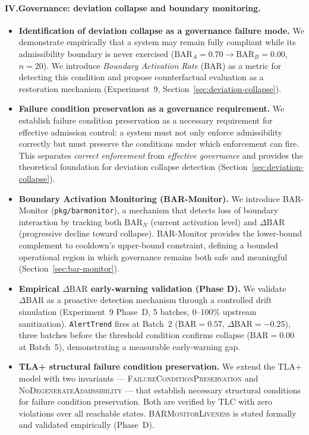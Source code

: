 \documentclass[11pt]{article}
\theoremstyle{definition}
\begin{document}
\paragraph{IV.\enspace Governance: deviation collapse and boundary monitoring.}
\begin{itemize}[noitemsep]
  \item \textbf{Identification of deviation collapse as a governance failure mode.}
    We demonstrate empirically that a system may remain fully compliant while its
    admissibility boundary is never exercised
    ($\mathrm{BAR}_A = 0.70 \to \mathrm{BAR}_B = 0.00$, $n=20$).
    We introduce \emph{Boundary Activation Rate} (BAR) as a metric for detecting this
    condition and propose counterfactual evaluation as a restoration mechanism
    (Experiment~9, Section~\ref{sec:deviation-collapse}).
  \item \textbf{Failure condition preservation as a governance requirement.}
    We establish failure condition preservation as a necessary requirement for
    effective admission control: a system must not only enforce admissibility
    correctly but must preserve the conditions under which enforcement can fire.
    This separates \emph{correct enforcement} from \emph{effective governance}
    and provides the theoretical foundation for deviation collapse detection
    (Section~\ref{sec:deviation-collapse}).
  \item \textbf{Boundary Activation Monitoring (BAR-Monitor).}
    We introduce BAR-Monitor (\texttt{pkg/barmonitor}), a mechanism that detects
    loss of boundary interaction by tracking both $\mathrm{BAR}_N$ (current
    activation level) and $\Delta\mathrm{BAR}$ (progressive decline toward collapse).
    BAR-Monitor provides the lower-bound complement to cooldown's upper-bound
    constraint, defining a bounded operational region in which governance
    remains both safe and meaningful (Section~\ref{sec:bar-monitor}).
  \item \textbf{Empirical $\Delta\mathrm{BAR}$ early-warning validation (Phase D).}
    We validate $\Delta\mathrm{BAR}$ as a proactive detection mechanism through a
    controlled drift simulation (Experiment~9 Phase~D, 5 batches, 0--100\%
    upstream sanitization).
    \texttt{AlertTrend} fires at Batch~2 ($\mathrm{BAR}=0.57$, $\Delta\mathrm{BAR}=-0.25$),
    three batches before the threshold condition confirms collapse ($\mathrm{BAR}=0.00$
    at Batch~5), demonstrating a measurable early-warning gap.
  \item \textbf{TLA+ structural failure condition preservation.}
    We extend the TLA+ model with two invariants ---
    \textsc{FailureConditionPreservation} and \textsc{NoDegenerateAdmissibility} ---
    that establish necessary structural conditions for failure condition preservation.
    Both are verified by TLC with zero violations over all reachable states.
    \textsc{BARMonitorLiveness} is stated formally and validated empirically (Phase~D).
\end{itemize}
\end{document}
